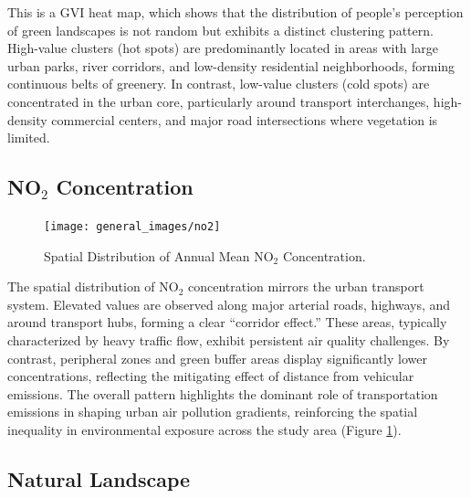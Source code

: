 \documentclass[
  12pt,
  oneside]{book}
\begin{document}
This is a GVI heat map, which shows that the distribution of people's perception of green landscapes is not random but exhibits a distinct clustering pattern. High-value clusters (hot spots) are predominantly located in areas with large urban parks, river corridors, and low-density residential neighborhoods, forming continuous belts of greenery. In contrast, low-value clusters (cold spots) are concentrated in the urban core, particularly around transport interchanges, high-density commercial centers, and major road intersections where vegetation is limited.

\subsection{\texorpdfstring{NO\(_2\) Concentration}{NO\_2 Concentration}}\label{no_2-concentration}

\begin{figure}

{\centering \texttt{[image: general\_images/no2]} 

}

\caption{Spatial Distribution of Annual Mean NO$_2$ Concentration.}\label{fig:no2}
\end{figure}

The spatial distribution of NO\(_2\) concentration mirrors the urban transport system. Elevated values are observed along major arterial roads, highways, and around transport hubs, forming a clear ``corridor effect.'' These areas, typically characterized by heavy traffic flow, exhibit persistent air quality challenges. By contrast, peripheral zones and green buffer areas display significantly lower concentrations, reflecting the mitigating effect of distance from vehicular emissions. The overall pattern highlights the dominant role of transportation emissions in shaping urban air pollution gradients, reinforcing the spatial inequality in environmental exposure across the study area (Figure \ref{fig:no2}).

\subsection{Natural Landscape}\label{natural-landscape}
\end{document}
